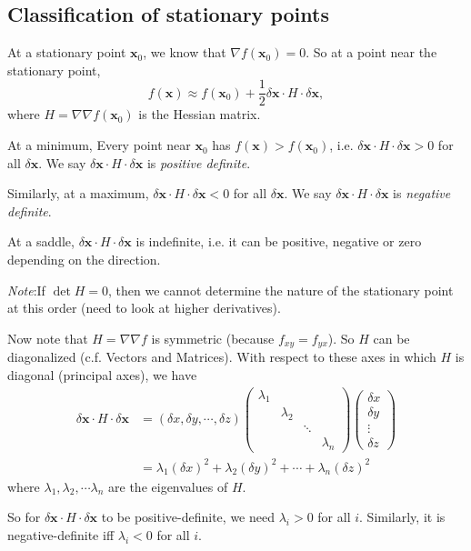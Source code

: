 \documentclass[a4paper]{article}
\theoremstyle{definition}
\newcommand{\mb}[1]{\mathbf{#1}}
\newcommand{\note}{\noindent \emph{Note}:\;}
\begin{document}
\subsection{Classification of stationary points}
At a stationary point $\mb{x}_0$, we know that $\nabla f(\mb{x}_0) = 0$. So at a point near the stationary point,
\[
f(\mb{x})\approx f(\mb{x}_0) + \frac{1}{2}\delta\mb{x}\cdot H\cdot \delta\mb{x},
\]
where $H = \nabla\nabla f(\mb{x}_0)$  is the Hessian matrix.

At a minimum, Every point near $\mb{x}_0$ has $f(\mb{x}) > f(\mb{x}_0)$, i.e. $\delta \mb{x}\cdot H\cdot \delta \mb{x} > 0$ for all $\delta \mb{x}$. We say $\delta \mb{x}\cdot H\cdot\delta \mb{x}$ is \emph{positive definite}.

Similarly, at a maximum, $\delta \mb{x}\cdot H\cdot \delta\mb{x} < 0$ for all $\delta \mb{x}$. We say $\delta \mb{x}\cdot H\cdot \delta \mb{x}$ is \emph{negative definite}.

At a saddle, $\delta \mb{x} \cdot H\cdot \delta\mb{x}$ is indefinite, i.e. it can be positive, negative or zero depending on the direction.

\note If $\det H = 0$, then we cannot determine the nature of the stationary point at this order (need to look at higher derivatives).

Now note that $H = \nabla\nabla f$ is symmetric (because $f_{xy} = f_{yx}$). So $H$ can be diagonalized (c.f. Vectors and Matrices). With respect to these axes in which $H$ is diagonal (principal axes), we have
\begin{align*}
  \delta\mb{x}\cdot H\cdot \delta\mb{x} &= (\delta x, \delta y, \cdots, \delta z)
  \begin{pmatrix}
    \lambda_1\\
    &\lambda_2\\
    &&\ddots\\
    &&&\lambda_n
  \end{pmatrix}
  \begin{pmatrix}
    \delta x\\\delta y\\\vdots\\\delta z
  \end{pmatrix}\\
  &= \lambda_1(\delta x)^2 + \lambda_2 (\delta y)^2 + \cdots + \lambda_n(\delta z)^2
\end{align*}
where $\lambda_1, \lambda_2, \cdots \lambda_n$ are the eigenvalues of $H$. 

So for $\delta \mb{x}\cdot H\cdot \delta \mb{x}$ to be positive-definite, we need $\lambda_i > 0$ for all $i$. Similarly, it is negative-definite iff $\lambda_i < 0$ for all $i$.
\end{document}
